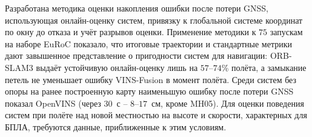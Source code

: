     Разработана методика оценки накопления ошибки после потери GNSS, использующая онлайн-оценку систем, привязку к глобальной системе координат по окну до отказа и учёт разрывов оценки.
    Применение методики к $75$ запускам на наборе EuRoC показало, что итоговые траектории и стандартные метрики дают завышенное представление о пригодности систем для навигации: ORB-SLAM3 выдаёт устойчивую онлайн-оценку лишь на $57$--$74$\% полёта, а замыкание петель не уменьшает ошибку VINS-Fusion в момент полёта.
    Среди систем без опоры на ранее построенную карту наименьшую ошибку после потери GNSS показал OpenVINS (через $30$~с -- $8$--$17$~см, кроме MH05).
    Для оценки поведения систем при полёте над новой местностью на высоте и скорости, характерных для БПЛА, требуются данные, приближенные к этим условиям.
    \clearpage
